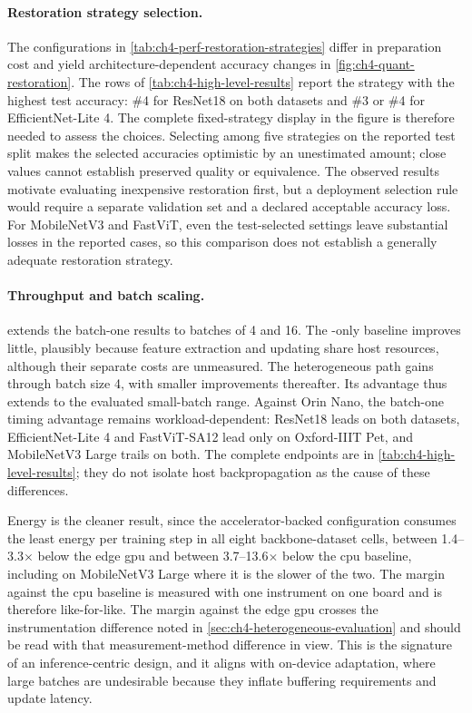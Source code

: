 \paragraph{Restoration strategy selection.} The configurations in \cref{tab:ch4-perf-restoration-strategies} differ in preparation cost and yield architecture-dependent accuracy changes in \cref{fig:ch4-quant-restoration}. The rows of \cref{tab:ch4-high-level-results} report the strategy with the highest test accuracy: \#4 for ResNet18 on both datasets and \#3 or \#4 for EfficientNet-Lite 4. The complete fixed-strategy display in the figure is therefore needed to assess the choices. Selecting among five strategies on the reported test split makes the selected accuracies optimistic by an unestimated amount; close values cannot establish preserved quality or equivalence. The observed results motivate evaluating inexpensive restoration first, but a deployment selection rule would require a separate validation set and a declared acceptable accuracy loss. For MobileNetV3 and FastViT, even the test-selected settings leave substantial losses in the reported cases, so this comparison does not establish a generally adequate restoration strategy.

\paragraph{Throughput and batch scaling.}  extends the batch-one results to batches of 4 and 16. The -only baseline improves little, plausibly because feature extraction and updating share host resources, although their separate costs are unmeasured. The heterogeneous path gains through batch size 4, with smaller improvements thereafter. Its advantage thus extends to the evaluated small-batch range. Against Orin Nano, the batch-one timing advantage remains workload-dependent: ResNet18 leads on both datasets, EfficientNet-Lite 4 and FastViT-SA12 lead only on Oxford-IIIT Pet, and MobileNetV3 Large trails on both. The complete endpoints are in \cref{tab:ch4-high-level-results}; they do not isolate host backpropagation as the cause of these differences.

Energy is the cleaner result, since the accelerator-backed configuration consumes the least energy per training step in all eight backbone-dataset cells, between \numrange{1.4}{3.3}$\times$ below the edge \gls{gpu} and between \numrange{3.7}{13.6}$\times$ below the \gls{cpu} baseline, including on MobileNetV3 Large where it is the slower of the two. The margin against the \gls{cpu} baseline is measured with one instrument on one board and is therefore like-for-like. The margin against the edge \gls{gpu} crosses the instrumentation difference noted in \cref{sec:ch4-heterogeneous-evaluation} and should be read with that measurement-method difference in view. This is the signature of an inference-centric design, and it aligns with on-device adaptation, where large batches are undesirable because they inflate buffering requirements and update latency.

